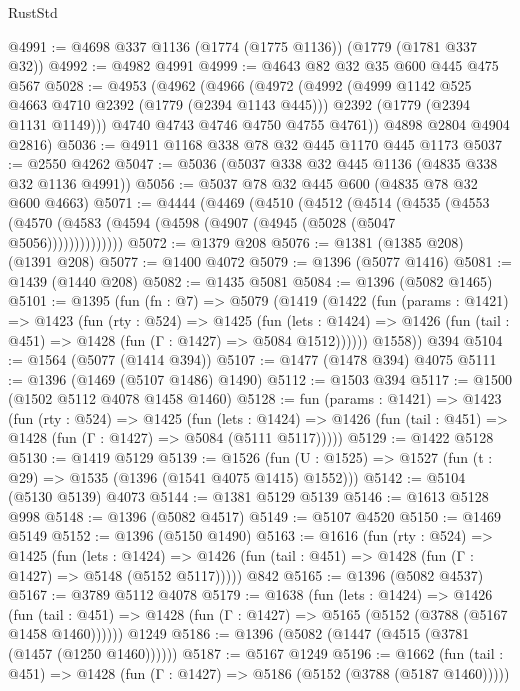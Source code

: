 \begin{lexlean}{RustStd}
\begin{coremodule}
@4991 := @4698 @337 @1136 (@1774 (@1775 @1136)) (@1779 (@1781 @337 @32))
@4992 := @4982 @4991
@4999 := @4643 @82 @32 @35 @600 @445 @475 @567
@5028 := @4953
    (@4962
      (@4966
        (@4972
          (@4992
            (@4999 @1142 @525 @4663 @4710 @2392 (@1779 (@2394 @1143 @445)))
            @2392
            (@1779 (@2394 @1131 @1149)))
          @4740
          @4743
          @4746
          @4750
          @4755
          @4761))
      @4898
      @2804
      @4904
      @2816)
@5036 := @4911 @1168 @338 @78 @32 @445 @1170 @445 @1173
@5037 := @2550 @4262
@5047 := @5036 (@5037 @338 @32 @445 @1136 (@4835 @338 @32 @1136 @4991))
@5056 := @5037 @78 @32 @445 @600 (@4835 @78 @32 @600 @4663)
@5071 := @4444
    (@4469
      (@4510
        (@4512
          (@4514
            (@4535
              (@4553 (@4570 (@4583 (@4594 (@4598 (@4907 (@4945 (@5028 (@5047 @5056))))))))))))))
@5072 := @1379 @208
@5076 := @1381 (@1385 @208) (@1391 @208)
@5077 := @1400 @4072
@5079 := @1396 (@5077 @1416)
@5081 := @1439 (@1440 @208)
@5082 := @1435 @5081
@5084 := @1396 (@5082 @1465)
@5101 := @1395
    (fun (fn : @7) =>
    @5079
      (@1419
        (@1422
          (fun (params : @1421) =>
          @1423
            (fun (rty : @524) =>
            @1425
              (fun (lets : @1424) =>
              @1426 (fun (tail : @451) => @1428 (fun (Γ : @1427) => @5084 @1512))))))
        @1558))
    @394
@5104 := @1564 (@5077 (@1414 @394))
@5107 := @1477 (@1478 @394) @4075
@5111 := @1396 (@1469 (@5107 @1486) @1490)
@5112 := @1503 @394
@5117 := @1500 (@1502 @5112 @4078 @1458 @1460)
@5128 := fun (params : @1421) =>
  @1423
    (fun (rty : @524) =>
    @1425
      (fun (lets : @1424) =>
      @1426 (fun (tail : @451) => @1428 (fun (Γ : @1427) => @5084 (@5111 @5117)))))
@5129 := @1422 @5128
@5130 := @1419 @5129
@5139 := @1526 (fun (U : @1525) => @1527 (fun (t : @29) => @1535 (@1396 (@1541 @4075 @1415) @1552)))
@5142 := @5104 (@5130 @5139) @4073
@5144 := @1381 @5129 @5139
@5146 := @1613 @5128 @998
@5148 := @1396 (@5082 @4517)
@5149 := @5107 @4520
@5150 := @1469 @5149
@5152 := @1396 (@5150 @1490)
@5163 := @1616
    (fun (rty : @524) =>
    @1425
      (fun (lets : @1424) =>
      @1426 (fun (tail : @451) => @1428 (fun (Γ : @1427) => @5148 (@5152 @5117)))))
    @842
@5165 := @1396 (@5082 @4537)
@5167 := @3789 @5112 @4078
@5179 := @1638
    (fun (lets : @1424) =>
    @1426
      (fun (tail : @451) => @1428 (fun (Γ : @1427) => @5165 (@5152 (@3788 (@5167 @1458 @1460))))))
    @1249
@5186 := @1396 (@5082 (@1447 (@4515 (@3781 (@1457 (@1250 @1460))))))
@5187 := @5167 @1249
@5196 := @1662
    (fun (tail : @451) => @1428 (fun (Γ : @1427) => @5186 (@5152 (@3788 (@5187 @1460)))))

\end{coremodule}
\end{lexlean}
